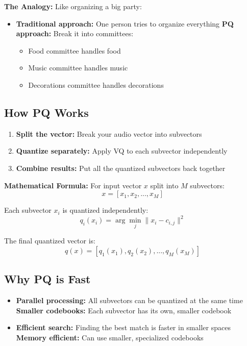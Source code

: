 \documentclass[12pt]{article}
\begin{document}
\textbf{The Analogy:} Like organizing a big party:
\begin{itemize}
    \item \textbf{Traditional approach:} One person tries to organize everything
    \textbf{PQ approach:} Break it into committees:
    \begin{itemize}
        \item Food committee handles food
        \item Music committee handles music
        \item Decorations committee handles decorations
    \end{itemize}
\end{itemize}

\subsection{How PQ Works}

\begin{enumerate}
    \item \textbf{Split the vector:} Break your audio vector into subvectors
    \item \textbf{Quantize separately:} Apply VQ to each subvector independently
    \item \textbf{Combine results:} Put all the quantized subvectors back together
\end{enumerate}

\textbf{Mathematical Formula:} For input vector $x$ split into $M$ subvectors:
$$x = [x_1, x_2, ..., x_M]$$

Each subvector $x_i$ is quantized independently:
$$q_i(x_i) = \arg\min_{j} \|x_i - c_{i,j}\|^2$$

The final quantized vector is:
$$q(x) = [q_1(x_1), q_2(x_2), ..., q_M(x_M)]$$

\subsection{Why PQ is Fast}

\begin{itemize}
    \item \textbf{Parallel processing:} All subvectors can be quantized at the same time
    \textbf{Smaller codebooks:} Each subvector has its own, smaller codebook
    \item \textbf{Efficient search:} Finding the best match is faster in smaller spaces
    \textbf{Memory efficient:} Can use smaller, specialized codebooks
\end{itemize}
\end{document}
